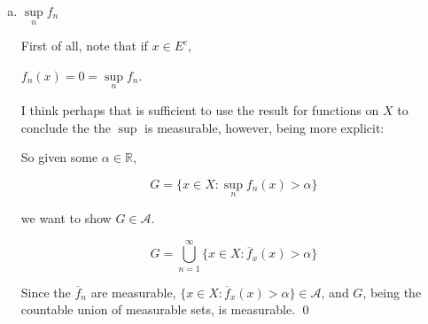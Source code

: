 \documentclass[11pt,oneside]{article}
\numberwithin{equation}{section}
\theoremstyle{definition}
\def\RR{\mathbb{R}}
\def\fancyA{\mathscr{A}}
\begin{document}
\begin{solution}
\begin{enumerate}[(a)]
  Now we show a sequence of combining mesaureable functions to get the result that $\overline f \overline g: X \to \overline \RR$ is measureable:

  $f, g$ are measurable, given.

  So $(f + g)$ is measurable, $\overline f + \overline g = \overline {( f + g)} $

  From the above lemma, $f^2$ and $g^2$ are measurable, as are $-f^2$ and $-g^2$.

  $ (f+g)^2$ is measurable.

  $(f^2 + 2 fg + g^2)$ is measurable (just pointwise expanding prior line).

  $(f^2 + 2 fg + g^2 - f^2 - g^2)$ is measurable (adding in $-f^2$ and $-g^2$)

  $2 f g $ is measurable.

  $ 1/2 \times 2 f g$ is measurable.

  $ f g$ is measurable.  
  \qed
  
\item
  $\sup \limits _{n} f_n$

  First of all, note that if $x \in E^c$,

  $f_n(x) = 0 = \sup \limits _ {n} f_n$.

  I think perhaps that is sufficient to use the result for functions
  on $X$ to conclude the the $\sup$ is measurable, however, being more explicit:
  
  So given some $\alpha \in \RR$,

  \[
  G = \{ x \in X : \sup \limits _{n} f_n(x) >  \alpha \}
  \]

  we want to show $G \in \fancyA$.

  \[
  G = \bigcup \limits _ {n=1} ^ \infty \{ x \in X : \overline f_x(x) > \alpha \}
  \]

  Since the $\overline f_n$ are measurable,  $\{ x \in X : \overline f_x(x) > \alpha \} \in \fancyA$,
  and $G$, being the countable union of measurable sets, is measurable.
  \qed
\end{enumerate}
\end{solution}
\end{document}

